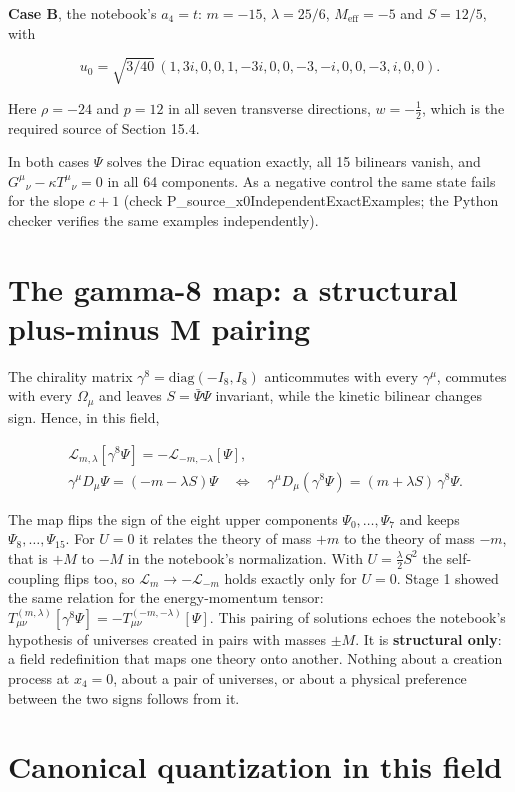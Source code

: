 \documentclass[11pt]{article}
\begin{document}
\textbf{Case B}, the notebook's $a_4=t$: $m=-15$, $\lambda=25/6$, $M_{\mathrm{eff}}=-5$ and $S=12/5$, with

\[
u_0=\sqrt{3/40}\,(1,3i,0,0,1,-3i,0,0,-3,-i,0,0,-3,i,0,0).
\]

Here $\rho=-24$ and $p=12$ in all seven transverse directions, $w=-\tfrac12$, which is the required source of Section 15.4.

In both cases $\Psi$ solves the Dirac equation exactly, all 15 bilinears vanish, and $G^\mu{}_\nu-\kappa T^\mu{}_\nu=0$ in all 64 components. As a negative control the same state fails for the slope $c+1$ (check P\_source\_x0IndependentExactExamples; the Python checker verifies the same examples independently).

\section{The gamma-8 map: a structural plus-minus M pairing}

The chirality matrix $\gamma^8=\mathrm{diag}(-I_8,I_8)$ anticommutes with every $\gamma^\mu$, commutes with every $\Omega_\mu$ and leaves $S=\bar\Psi\Psi$ invariant, while the kinetic bilinear changes sign. Hence, in this field,

\[
\begin{aligned}
&\mathcal L_{m,\lambda}[\gamma^8\Psi]=-\mathcal L_{-m,-\lambda}[\Psi], \\
&\gamma^\mu D_\mu\Psi=(-m-\lambda S)\Psi\quad\Longleftrightarrow\quad \gamma^\mu D_\mu(\gamma^8\Psi)=(m+\lambda S)\,\gamma^8\Psi .
\end{aligned}
\]

The map flips the sign of the eight upper components $\Psi_0,\dots,\Psi_7$ and keeps $\Psi_8,\dots,\Psi_{15}$. For $U=0$ it relates the theory of mass $+m$ to the theory of mass $-m$, that is $+M$ to $-M$ in the notebook's normalization. With $U=\tfrac\lambda2S^2$ the self-coupling flips too, so $\mathcal L_m\to-\mathcal L_{-m}$ holds exactly only for $U=0$. Stage 1 showed the same relation for the energy-momentum tensor: $T^{(m,\lambda)}_{\mu\nu}[\gamma^8\Psi]=-T^{(-m,-\lambda)}_{\mu\nu}[\Psi]$. This pairing of solutions echoes the notebook's hypothesis of universes created in pairs with masses $\pm M$. It is \textbf{structural only}: a field redefinition that maps one theory onto another. Nothing about a creation process at $x_4=0$, about a pair of universes, or about a physical preference between the two signs follows from it.

\section{Canonical quantization in this field}
\end{document}
